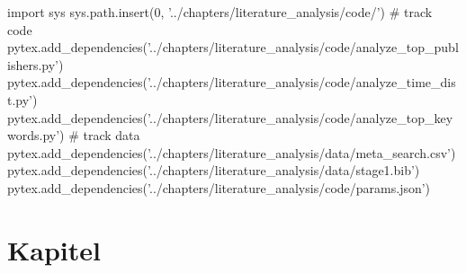 % 
\begin{pycode}
import sys
sys.path.insert(0, '../chapters/literature_analysis/code/')
# track code
pytex.add_dependencies('../chapters/literature_analysis/code/analyze_top_publishers.py')
pytex.add_dependencies('../chapters/literature_analysis/code/analyze_time_dist.py')
pytex.add_dependencies('../chapters/literature_analysis/code/analyze_top_keywords.py')
# track data
pytex.add_dependencies('../chapters/literature_analysis/data/meta_search.csv')
pytex.add_dependencies('../chapters/literature_analysis/data/stage1.bib')
pytex.add_dependencies('../chapters/literature_analysis/code/params.json')
\end{pycode}

\chapter{Kapitel}
\label{chap:chapters} 

